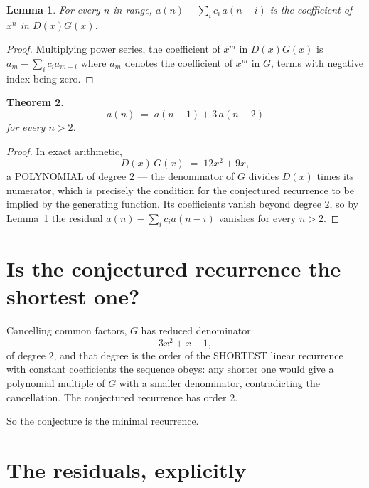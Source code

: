 \documentclass[11pt,a4paper]{article}
\theoremstyle{plain}
\newtheorem{theorem}{Theorem}
\newtheorem{lemma}[theorem]{Lemma}
\theoremstyle{definition}
\begin{document}
\begin{lemma}\label{lem:key}
For every $n$ in range, $a(n)-\sum_i c_i\,a(n-i)$ is the coefficient of $x^{n}$ in
$D(x)G(x)$.
\end{lemma}

\begin{proof}
Multiplying power series, the coefficient of $x^{m}$ in $D(x)G(x)$ is
$a_m-\sum_i c_i a_{m-i}$ where $a_m$ denotes the coefficient of $x^{m}$ in $G$, terms with
negative index being zero.
\end{proof}

\begin{theorem}
\[
a(n)\;=\;a(n-1) + 3\,a(n-2)
\]
for every $n>2$.
\end{theorem}

\begin{proof}
In exact arithmetic,
\[
D(x)\,G(x)\;=\;12 x^{2} + 9 x,
\]
a POLYNOMIAL of degree $2$ --- the denominator of $G$ divides $D(x)$ times its numerator,
which is precisely the condition for the conjectured recurrence to be implied by the
generating function. Its coefficients vanish beyond degree $2$, so by
Lemma~\ref{lem:key} the residual $a(n)-\sum_ic_ia(n-i)$ vanishes for every
$n>2$.
\end{proof}

\section{Is the conjectured recurrence the shortest one?}

Cancelling common factors, $G$ has reduced denominator
\[
3 x^{2} + x - 1,
\]
of degree $2$, and that degree is the order of the SHORTEST linear recurrence with
constant coefficients the sequence obeys: any shorter one would give a polynomial multiple of
$G$ with a smaller denominator, contradicting the cancellation. The conjectured recurrence has
order $2$.

So the conjecture is the minimal recurrence.

\section{The residuals, explicitly}
\end{document}
